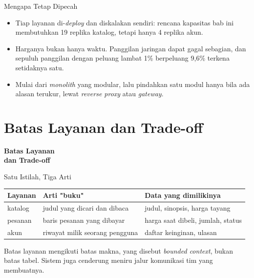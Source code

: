 \documentclass[aspectratio=169, table, 12pt]{beamer}
\begin{document}
\begin{frame}{{\Large Mengapa Tetap Dipecah}}
  \vspace{12pt}
  \begin{itemize}
    \item Tiap layanan di-\textit{deploy} dan diskalakan sendiri: rencana
          kapasitas bab ini membutuhkan 19 replika katalog, tetapi hanya 4
          replika akun.
    \item Harganya bukan hanya waktu. Panggilan jaringan dapat gagal
          sebagian, dan sepuluh panggilan dengan peluang lambat 1\% berpeluang
          9,6\% terkena setidaknya satu.
    \item Mulai dari \textit{monolith} yang modular, lalu pindahkan satu modul
          hanya bila ada alasan terukur, lewat \textit{reverse proxy} atau
          \textit{gateway}.
  \end{itemize}
\end{frame}

\section{Batas Layanan dan Trade-off}

\begin{frame}{\hfill}
  \centering
  \Huge{\textbf{Batas Layanan\\dan Trade-off}}
\end{frame}

\begin{frame}{{\Large Satu Istilah, Tiga Arti}}
  \vspace{6pt}
  \centering
  {\footnotesize
  \begin{tabularx}{\textwidth}{lYY}
    \hline
    \textbf{Layanan} & \textbf{Arti "buku"} & \textbf{Data yang dimilikinya} \\
    \hline
    katalog & judul yang dicari dan dibaca & judul, sinopsis, harga tayang \\
    \hline
    pesanan & baris pesanan yang dibayar & harga saat dibeli, jumlah, status \\
    \hline
    akun & riwayat milik seorang pengguna & daftar keinginan, ulasan \\
    \hline
  \end{tabularx}}

  \vspace{6pt}
  {\small Batas layanan mengikuti batas makna, yang disebut \textit{bounded
  context}, bukan batas tabel. Sistem juga cenderung meniru jalur komunikasi
  tim yang membuatnya.}
\end{frame}
\end{document}
